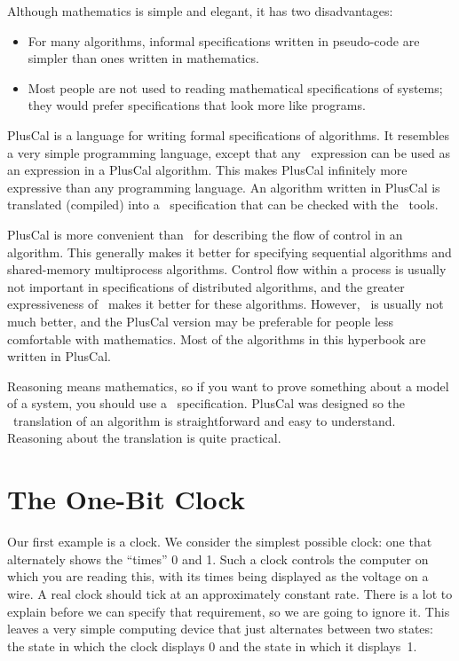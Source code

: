\documentclass[fleqn,leqno]{article}
\begin{document}
Although mathematics is simple and elegant, it has two disadvantages:
\begin{itemize}
\item For many algorithms, informal specifications written in
pseudo-code are simpler than ones written in mathematics.

\item Most people are not used to reading mathematical specifications
of systems; they would prefer specifications that look more like
programs.
\end{itemize}
%
PlusCal 
is a language for writing formal specifications of algorithms.
It resembles a very simple programming language, except that any
\tlaplus\ expression can be used as an expression in a PlusCal
algorithm.  This makes PlusCal infinitely more expressive than any
programming language.  An algorithm written in PlusCal is translated
(compiled) into a \tlaplus\ specification that can be checked with the
\tlaplus\ tools.

PlusCal is more convenient than \tlaplus\ for describing the flow of
control in an algorithm.  This generally makes it better for
specifying sequential algorithms and shared-memory multiprocess
algorithms.  Control flow within a process is usually not important in
specifications of distributed algorithms, and the greater
expressiveness of \tlaplus\ makes it better for these algorithms.
However, \tlaplus\ is usually not much better, and the PlusCal version
may be preferable for people less comfortable with mathematics.  
Most of the algorithms in this hyperbook are written in PlusCal.

Reasoning means mathematics, so if you want to prove something about a
model of a system, you should use a \tlaplus\ specification.  PlusCal
was designed so the \tlaplus\ translation of an algorithm is 
straightforward and easy to understand.  Reasoning about the
translation is quite practical.

 
\newpage
 \vspace{-\baselineskip}%
\section{The One-Bit Clock}

Our first example is a clock.  We consider the simplest possible
clock: one that alternately shows the ``times'' 0 and 1.  Such a clock
controls the computer on which you are reading this, with its times
being displayed as the voltage on a wire.  A real clock should tick at
an approximately constant rate.  There is a lot to explain before we
can specify that requirement, so we are going to ignore it.  This
leaves a very simple computing device that just alternates between two
states: the state in which the clock displays 0 and the state in which
it displays~1.
\end{document}
